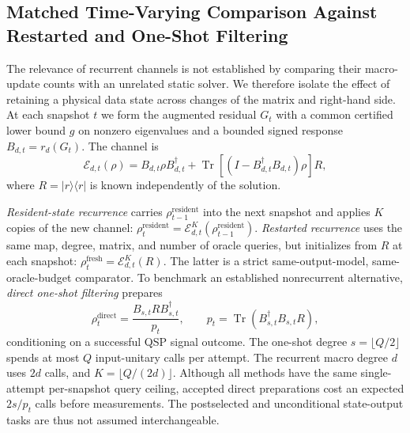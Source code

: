 \subsection{Matched Time-Varying Comparison Against Restarted and One-Shot Filtering}
\label{sec:matched_temporal_comparison}

The relevance of recurrent channels is not established by comparing their
macro-update counts with an unrelated static solver. We therefore isolate
the effect of retaining a physical data state across changes of the matrix
and right-hand side. At each snapshot $t$ we form the augmented residual
$G_t$ with a common certified lower bound $g$ on nonzero eigenvalues and a
bounded signed response $B_{d,t}=r_d(G_t)$. The channel is
\begin{equation}
\mathcal{E}_{d,t}(\rho)=B_{d,t}\rho B_{d,t}^{\dagger}
 +\operatorname{Tr}[(I-B_{d,t}^{\dagger}B_{d,t})\rho]R,
\end{equation}
where $R=|r\rangle\langle r|$ is known independently of the solution.

\emph{Resident-state recurrence} carries $\rho_{t-1}^{\mathrm{resident}}$
into the next snapshot and applies $K$ copies of the new channel:
$\rho_t^{\mathrm{resident}}=\mathcal{E}_{d,t}^{K}
(\rho_{t-1}^{\mathrm{resident}})$. \emph{Restarted recurrence} uses the
same map, degree, matrix, and number of oracle queries, but initializes
from $R$ at each snapshot:
$\rho_t^{\mathrm{fresh}}=\mathcal{E}_{d,t}^{K}(R)$.
The latter is a strict same-output-model, same-oracle-budget comparator.
To benchmark an established nonrecurrent alternative, \emph{direct
one-shot filtering} prepares
\begin{equation}
\rho_t^{\mathrm{direct}}
=\frac{B_{s,t}R B_{s,t}^{\dagger}}{p_t},\qquad
p_t=\operatorname{Tr}(B_{s,t}^{\dagger}B_{s,t}R),
\end{equation}
conditioning on a successful QSP signal outcome. The one-shot degree
$s=\lfloor Q/2\rfloor$ spends at most $Q$ input-unitary calls per attempt.
The recurrent macro degree $d$ uses $2d$ calls, and
$K=\lfloor Q/(2d)\rfloor$. Although all methods have the same single-attempt
per-snapshot query ceiling, accepted direct preparations cost an expected
$2s/p_t$ calls before measurements. The postselected and unconditional
state-output tasks are thus not assumed interchangeable.

